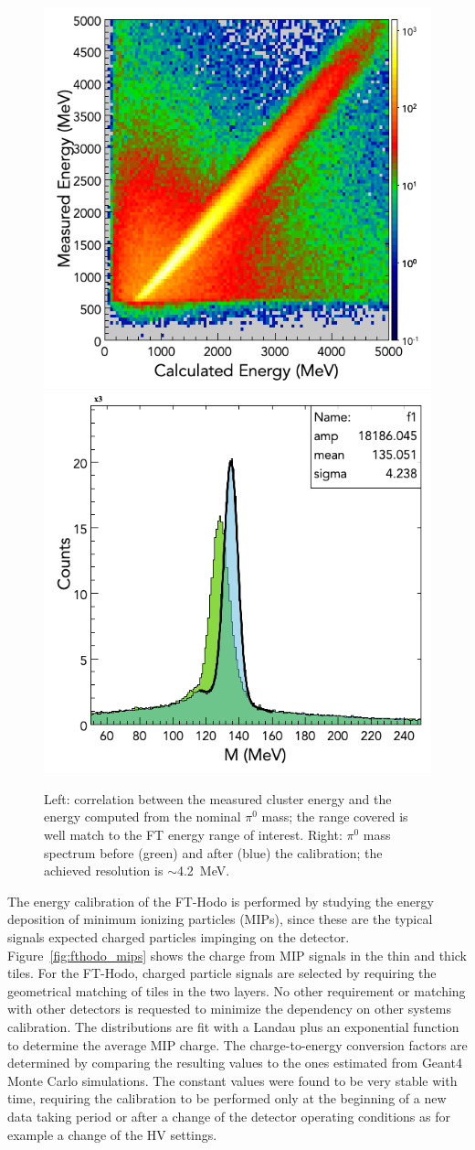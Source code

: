 \begin{figure}
\includegraphics[height=0.48\columnwidth]{fig/ftcal_pi0linearity.png}
\includegraphics[height=0.48\columnwidth]{fig/ftcal_pi0resolution.png}
\caption{Left: correlation between the measured cluster energy and the energy computed from the nominal $\pi^0$
  mass; the range covered is well match to the FT energy range of interest. Right: $\pi^0$ mass spectrum before
  (green) and after (blue) the calibration; the achieved resolution is $\sim$4.2~MeV.}
\label{fig:ftcal_pi0res}
\end{figure}

{\color{green} The energy calibration of the FT-Hodo is performed by studying the energy deposition of minimum ionizing particles
(MIPs), since these are the typical signals expected charged particles impinging on the detector. Figure~\ref{fig:fthodo_mips} shows the charge from MIP signals in the thin and thick tiles. For the FT-Hodo,
charged particle signals are selected by requiring the geometrical matching of tiles in the two layers. No other requirement or matching with other detectors is requested to minimize the dependency on other systems calibration. The
distributions are fit with a Landau plus an exponential function to determine the average MIP charge. The
charge-to-energy conversion factors are determined by comparing the resulting values to the ones estimated from
Geant4 Monte Carlo simulations. The constant values were found to be very stable with time, requiring the calibration to be performed only at the beginning of a new data taking period or after a change of the detector operating conditions as for example a change of the HV settings.}

